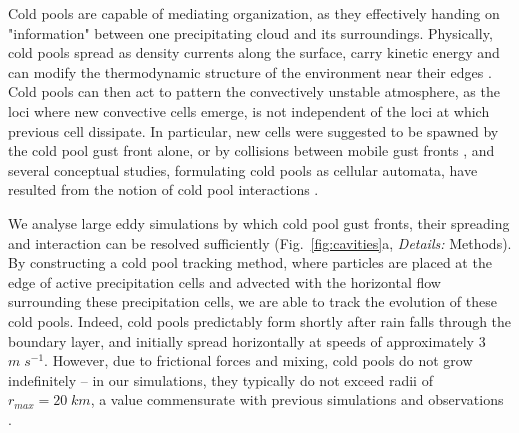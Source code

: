 \documentclass[reprint,amsmath,amssymb]{revtex4-1}
\begin{document}
Cold pools are capable of mediating organization, as they effectively handing on "information" between one precipitating cloud and its surroundings.
Physically, cold pools spread as density currents along the surface, carry kinetic energy and can modify the thermodynamic structure of the environment near their edges \cite{tompkins2001organizationCold,langhans2015origin,de2017cold}.
Cold pools can then act to pattern the convectively unstable atmosphere, as the loci where new convective cells emerge, is not independent of the loci at which previous cell dissipate.
In particular, new cells were suggested to be spawned by the cold pool gust front alone, or by collisions between mobile gust fronts \cite{de2017cold,glassmeier2017network,cafaro2018characteristics}, and several conceptual studies, formulating cold pools as cellular automata, have resulted from the notion of cold pool interactions \cite{grandpeix2010density,boing2016object,haerter2018reconciling}.


We analyse large eddy simulations by which cold pool gust fronts, their spreading and interaction can be resolved sufficiently (Fig.~\ref{fig:cavities}a, {\it Details:} Methods).
By constructing a cold pool tracking method, where particles are placed at the edge of active precipitation cells and advected with the horizontal flow surrounding these precipitation cells, we are able to track the evolution of these cold pools.
Indeed, cold pools predictably form shortly after rain falls through the boundary layer, and initially spread horizontally at speeds of approximately 3 $m\;s^{-1}$.
However, due to frictional forces and mixing, cold pools do not grow indefinitely -- in our simulations, they typically do not exceed radii of $r_{max}= 20\;km$, a value commensurate with previous simulations \cite{romps2016sizes} and observations \cite{black1978mesoscale,zuidema2012trade,feng2015mechanisms}.
\end{document}

